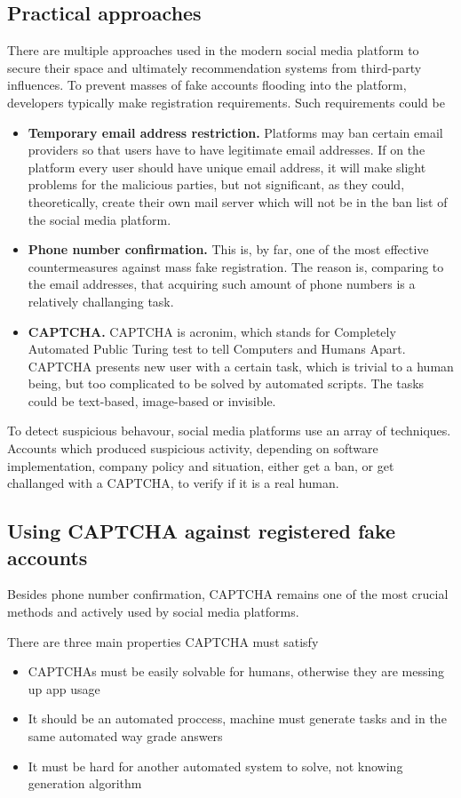 \documentclass[10pt,twocolumn,twoside,a4paper]{article} %
\begin{document}
\subsection{Practical approaches}
There are multiple approaches used in the modern social media platform to secure their space and ultimately recommendation systems from third-party influences.
To prevent masses of fake accounts flooding into the platform, developers typically make registration requirements. Such requirements could be
\begin{itemize}
    \item \textbf{Temporary email address restriction.} Platforms may ban certain email providers so that users have to have legitimate email addresses. If on the platform every user should have unique email address, it will make slight problems for the malicious parties, but not significant, as they could, theoretically, create their own mail server which will not be in the ban list of the social media platform.
    \item \textbf{Phone number confirmation.} This is, by far, one of the most effective countermeasures against mass fake registration. The reason is, comparing to the email addresses, that acquiring such amount of phone numbers is a relatively challanging task.
    \item \textbf{CAPTCHA.} CAPTCHA is acronim, which stands for Completely Automated Public Turing test to tell Computers and Humans Apart. \cite{singh2014survey} CAPTCHA presents new user with a certain task, which is trivial to a human being, but too complicated to be solved by automated scripts. The tasks could be text-based, image-based or invisible.
\end{itemize}

To detect suspicious behavour, social media platforms use an array of techniques. Accounts which produced suspicious activity, depending on software implementation, company policy and situation, either get a ban, or get challanged with a CAPTCHA, to verify if it is a real human.

\subsection{Using CAPTCHA against registered fake accounts}
Besides phone number confirmation, CAPTCHA remains one of the most crucial methods and actively used by social media platforms.

There are three main properties \cite{singh2014survey} CAPTCHA must satisfy
\begin{itemize}
    \item CAPTCHAs must be easily solvable for humans, otherwise they are messing up app usage
    \item It should be an automated proccess, machine must generate tasks and in the same automated way grade answers
    \item It must be hard for another automated system to solve, not knowing generation algorithm
\end{itemize}
\end{document}
